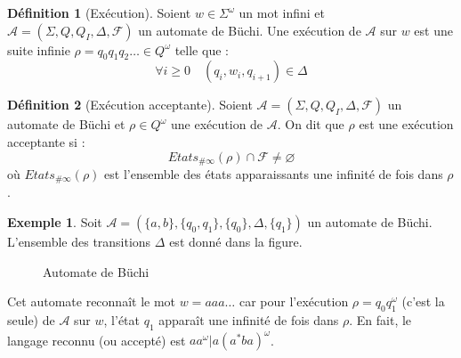 \documentclass[12pt,a4paper]{article}
\theoremstyle{plain}
\theoremstyle{definition}
\newtheorem{defi}{Définition}
\newtheorem{ex}{Exemple}
\begin{document}
\begin{defi}[Exécution]
  Soient $w \in \Sigma^\omega$ un mot infini et $\mathcal{A}=(\Sigma, Q, Q_I, \Delta, \mathscr{F})$ un automate de Büchi.
  Une exécution de $\mathcal{A}$ sur $w$ est une suite infinie $\rho = q_0q_1q_2\dots \in Q^\omega$ telle que :
  \[
    \forall i \geq 0 \quad (q_i, w_i, q_{i+1}) \in \Delta
  \]
\end{defi}

\begin{defi}[Exécution acceptante]  
  Soient $\mathcal{A}=(\Sigma, Q, Q_I, \Delta, \mathscr{F})$ un automate de Büchi et $\rho \in Q^\omega$ une exécution de $\mathcal{A}$.
  On dit que $\rho$ est une exécution acceptante si :
  \[
    Etats_{\#\infty}(\rho) \cap \mathscr{F} \neq \varnothing
  \]
  où $Etats_{\#\infty}(\rho)$ est l'ensemble des états apparaissants une infinité de fois dans $\rho$.
\end{defi}


\begin{ex}
  Soit $\mathcal{A}=(\{a,b\}, \{q_0, q_1\}, \{q_0\}, \Delta, \{q_1\})$ un automate de Büchi.
  L'ensemble des transitions $\Delta$ est donné dans la figure.
  \begin{figure}[h]
    \centering
    \caption{Automate de Büchi}
  \end{figure}
  
  Cet automate reconnaît le mot $w = aaa\dots$ car pour l'exécution $\rho = q_0q_1^\omega$ (c'est la seule) de $\mathcal{A}$ sur $w$, l'état $q_1$ apparaît une infinité de fois dans $\rho$.
  En fait, le langage reconnu (ou accepté) est $aa^\omega | a(a^*ba)^\omega$.
\end{ex}
\end{document}
